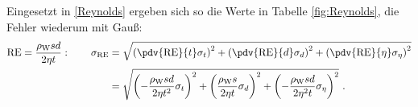 Eingesetzt in \eqref{Reynolds} ergeben sich so die Werte in Tabelle \ref{fig:Reynolds}, die Fehler wiederum mit Gauß:
\begin{align}
	\text{RE} = \frac{\rho_\text{W} s d}{2\eta t}: \qquad \sigma_{\text{RE}} &= \sqrt{\left(\pdv{\text{RE}}{t}\sigma_t\right)^2+\left(\pdv{\text{RE}}{d}\sigma_d\right)^2+\left(\pdv{\text{RE}}{\eta}\sigma_\eta\right)^2} \\
	&= \sqrt{\left(-\frac{\rho_\text{W}sd}{2\eta t^2}\sigma_t\right)^2+\left(\frac{\rho_\text{W}s}{2\eta t}\sigma_d\right)^2+\left(-\frac{\rho_\text{W}sd}{2\eta^2 t}\sigma_\eta\right)^2} \ .
\end{align}
